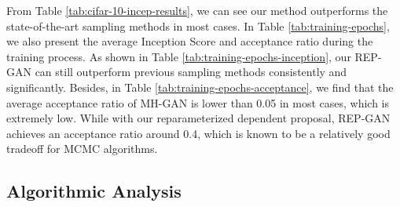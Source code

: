 \documentclass[runningheads]{llncs}
\newcommand{\<}{\left\langle}
\renewcommand{\>}{\right\rangle}
\begin{document}
\begin{table}[t]
        
        

\end{table}


From Table \ref{tab:cifar-10-incep-results}, we can see our method  outperforms the state-of-the-art sampling methods in most cases. 
In Table \ref{tab:training-epochs}, we also present the average Inception Score and acceptance ratio during the training process.
As shown in Table \ref{tab:training-epochs-inception}, our REP-GAN can still outperform previous sampling methods consistently and significantly. Besides, in Table \ref{tab:training-epochs-acceptance}, we find that the average acceptance ratio of MH-GAN is lower than 0.05 in most cases, which is extremely low. While with our reparameterized dependent proposal, REP-GAN achieves an acceptance ratio around 0.4, which is known to be a relatively good tradeoff for MCMC algorithms.

\subsection{Algorithmic Analysis}
\end{document}
